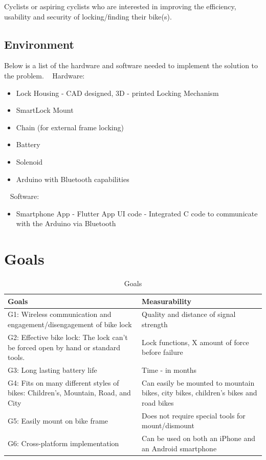 \documentclass{article}
\begin{document}
Cyclists or aspiring cyclists who are interested in improving the efficiency, usability and security of locking/finding their bike(s).

\newpage
\subsection{Environment}

Below is a list of the hardware and software needed to implement the solution to the problem.
~\newline
Hardware:
\begin{itemize}
\item Lock Housing - CAD designed, 3D - printed 
\subitem Locking Mechanism
\item SmartLock Mount
\item Chain (for external frame locking)
\item Battery
\item Solenoid
\item Arduino with Bluetooth capabilities
\end{itemize}

~\newline
Software: 
\begin{itemize}
\item Smartphone App
\subitem - Flutter App UI code
\subitem - Integrated C code to communicate with the Arduino via Bluetooth
\end{itemize}


\section{Goals}
\begin{table}[hp]
  \begin{center}
    \caption{Goals} \label{TblGoals}
    \begin{tabular}{| p{0.52\linewidth} | p{0.6\linewidth} |}
    \hline
      \textbf{Goals} & \textbf{Measurability}\\
      \hline
      G1: Wireless communication and \newline engagement/disengagement of bike lock  & Quality and distance of signal strength\\
      \hline
      G2: Effective bike lock: The lock can't be forced open by hand or standard tools.  & Lock functions, X amount of force before failure\\
      \hline
      G3: Long lasting battery life  & Time - in months \\
      \hline
     G4: Fits on many different styles of bikes: Children's, Mountain, Road, and City & Can easily be mounted to mountain bikes, city bikes, children's bikes and road bikes \\
      \hline
      G5: Easily mount on bike frame & Does not require special tools for mount/dismount\\
      \hline
       G6: Cross-platform implementation & Can be used on both an iPhone and an Android smartphone\\
      \hline
    \end{tabular}
  \end{center}
\end{table}
\end{document}
